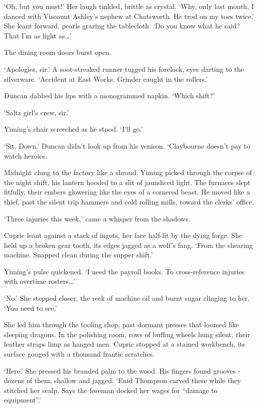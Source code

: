 `Oh, but you must!' Her laugh tinkled, brittle as crystal. `Why, only last month, I danced with Viscount Ashley's nephew at Chatsworth. He trod on my toes twice.' She leant forward, pearls grazing the tablecloth. `Do you know what he said? That I'm as light as\dots'

The dining room doors burst open.

`Apologies, sir.' A soot-streaked runner tugged his forelock, eyes darting to the silverware. `Accident at East Works. Grinder caught in the rollers.'

Duncan dabbed his lips with a monogrammed napkin. `Which shift?'

`Saltz girl's crew, sir.'

Yiming's chair screeched as he stood. `I'll go.'

`Sit. Down.' Duncan didn't look up from his venison. `Claybourne doesn't pay to watch heroics.

 Midnight clung to the factory like a shroud. Yiming picked through the corpse of the night shift, his lantern hooded to a slit of jaundiced light. The furnaces slept fitfully, their embers glowering like the eyes of a cornered beast. He moved like a thief, past the silent trip hammers and cold rolling mills, toward the clerks' office.

`Three injuries this week,' came a whisper from the shadows.

Cupric leant against a stack of ingots, her face half-lit by the dying forge. She held up a broken gear tooth, its edges jagged as a wolf's fang. `From the shearing machine. Snapped clean during the supper shift.'

Yiming's pulse quickened. `I need the payroll books. To cross-reference injuries with overtime rosters\dots'

`No.' She stepped closer, the reek of machine oil and burnt sugar clinging to her. `You need to see.'

She led him through the tooling shop, past dormant presses that loomed like sleeping dragons. In the polishing room, rows of buffing wheels hung silent, their leather straps limp as hanged men. Cupric stopped at a stained workbench, its surface gouged with a thousand frantic scratches.

`Here.' She pressed his branded palm to the wood. His fingers found grooves - dozens of them, shallow and jagged. `Enid Thompson carved these while they stitched her scalp. Says the foreman docked her wages for ``damage to equipment''.'

